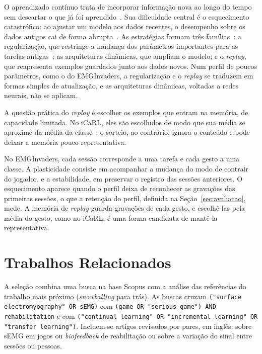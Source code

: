 \documentclass[runningheads]{llncs}
\begin{document}
O aprendizado contínuo trata de incorporar informação nova ao longo do tempo sem descartar o que já foi aprendido~\citep{parisi2019continual}. Sua dificuldade central é o esquecimento catastrófico: ao ajustar um modelo aos dados recentes, o desempenho sobre os dados antigos cai de forma abrupta~\citep{kirkpatrick2017overcoming}. As estratégias formam três famílias~\citep{parisi2019continual}: a regularização, que restringe a mudança dos parâmetros importantes para as tarefas antigas~\citep{kirkpatrick2017overcoming}; as arquiteturas dinâmicas, que ampliam o modelo; e o \textit{replay}, que reapresenta exemplos guardados junto aos dados novos. Num perfil de poucos parâmetros, como o do EMGInvaders, a regularização e o \textit{replay} se traduzem em formas simples de atualização, e as arquiteturas dinâmicas, voltadas a redes neurais, não se aplicam.

A questão prática do \textit{replay} é escolher os exemplos que entram na memória, de capacidade limitada. No iCaRL, eles são escolhidos de modo que sua média se aproxime da média da classe~\citep{rebuffi2017icarl}; o sorteio, ao contrário, ignora o conteúdo e pode deixar a memória pouco representativa.

No EMGInvaders, cada sessão corresponde a uma tarefa e cada gesto a uma classe. A plasticidade consiste em acompanhar a mudança do modo de contrair do jogador, e a estabilidade, em preservar o registro das sessões anteriores. O esquecimento aparece quando o perfil deixa de reconhecer as gravações das primeiras sessões, o que a retenção do perfil, definida na Seção~\ref{sec:avaliacao}, mede. A memória de \textit{replay} guarda gravações de cada gesto, e escolhê-las pela média do gesto, como no iCaRL, é uma forma candidata de mantê-la representativa.

\section{Trabalhos Relacionados}\label{sec:relacionados}

{\sloppy A seleção combina uma busca na base Scopus com a análise das referências do trabalho mais próximo (\textit{snowballing} para trás). As buscas cruzam \texttt{("surface electromyography" OR sEMG)} com \texttt{(game OR "serious game") AND rehabilitation} e com \texttt{("continual learning" OR "incremental learning" OR "transfer learning")}. Incluem-se artigos revisados por pares, em inglês, sobre sEMG em jogos ou \textit{biofeedback} de reabilitação ou sobre a variação do sinal entre sessões ou pessoas.\par}
\end{document}
